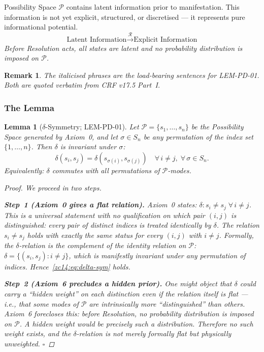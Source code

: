 \documentclass[12pt, a4paper]{article}
\newtheorem{lemma}{Lemma}[section]
\newtheorem{remark}{Remark}[section]
\begin{document}
\begin{formalbox}[title={Axiom~6: Latent Information
  (CRF v17.5 Part~I)}]
Possibility Space $\mathcal{P}$ contains latent information
prior to manifestation. This information is not yet explicit,
structured, or discretised --- it represents pure informational
potential.
\[
  \text{Latent Information}
  \xrightarrow{\mathcal{R}} \text{Explicit Information}
\]
\emph{Before Resolution acts, all states are latent and no
probability distribution is imposed on $\mathcal{P}$.}
\end{formalbox}

\begin{remark}
The italicised phrases are the load-bearing sentences for
LEM-PD-01. Both are quoted verbatim from CRF v17.5 Part~I.
\end{remark}

\subsubsection{The Lemma}
\label{zc14:sec:lem-pd-01}

\begin{lemma}[$\delta$-Symmetry; LEM-PD-01]
\label{zc14:lem:delta-symmetry}
Let $\mathcal{P} = \{s_1, \ldots, s_n\}$ be the Possibility
Space generated by Axiom~0, and let $\sigma \in S_n$ be any
permutation of the index set $\{1,\ldots,n\}$. Then
$\delta$ is invariant under $\sigma$:
\begin{equation}
  \delta(s_i, s_j) = \delta(s_{\sigma(i)}, s_{\sigma(j)})
  \quad \forall\, i \neq j,\; \forall\, \sigma \in S_n.
  \tag{EQ-PD-00}\label{zc14:eq:delta-sym}
\end{equation}
Equivalently: $\delta$ commutes with all permutations of
$\mathcal{P}$-modes.

\begin{proof}
We proceed in two steps.

\medskip
\textbf{Step~1 (Axiom~0 gives a flat relation).}
Axiom~0 states: $\delta: s_i \neq s_j \;\forall\, i\neq j$.
This is a \emph{universal} statement with no qualification on
which pair $(i,j)$ is distinguished: every pair of distinct
indices is treated identically by $\delta$. The relation
$s_i \neq s_j$ holds with exactly the same status for every
$(i,j)$ with $i\neq j$. Formally, the $\delta$-relation is the
complement of the identity relation on $\mathcal{P}$:
$\delta = \{(s_i, s_j) : i\neq j\}$,
which is manifestly invariant under any permutation of indices.
Hence~\eqref{zc14:eq:delta-sym} holds.

\medskip
\textbf{Step~2 (Axiom~6 precludes a hidden prior).}
One might object that $\delta$ could carry a ``hidden weight''
on each distinction even if the relation itself is flat ---
i.e., that some modes of $\mathcal{P}$ are intrinsically more
``distinguished'' than others. Axiom~6 forecloses this: before
Resolution, \emph{no probability distribution is imposed on
$\mathcal{P}$}. A hidden weight would be precisely such a
distribution. Therefore no such weight exists, and the
$\delta$-relation is not merely formally flat but physically
unweighted. \hfill$\square$
\end{proof}
\end{lemma}
\end{document}
